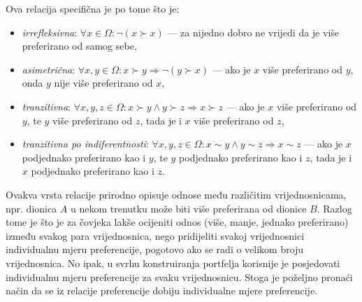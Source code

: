 \documentclass[lmodern, utf8, diplomski, numeric]{fer}
\begin{document}
  Ova relacija specifična je po tome što je:
  \begin{itemize}
    \item \textit{irrefleksivna}: $\forall x \in \Omega\colon \neg \left( x \succ x \right)$ --- za nijedno dobro ne vrijedi da je više preferirano od samog sebe,
    \item \textit{asimetrična}: $\forall x, y \in \Omega\colon x \succ y \Rightarrow \neg \left( y \succ x \right)$ --- ako je $x$ više preferirano od $y$, onda $y$ nije više preferirano od $x$,
    \item \textit{tranzitivna}: $\forall x, y, z \in \Omega\colon x \succ y \wedge y \succ z \Rightarrow x \succ z$ --- ako je $x$ više preferirano od $y$, te $y$ više preferirano od $z$, tada je i $x$ više preferirano od $z$,
    \item \textit{tranzitivna po indiferentnosti}: $\forall x, y, z \in \Omega\colon x \sim y \wedge y \sim z \Rightarrow x \sim z$ --- ako je $x$ podjednako preferirano kao i $y$, te $y$ podjednako preferirano kao i $z$, tada je i $x$ podjednako preferirano kao i $z$.
  \end{itemize}
  
  Ovakva vrsta relacije prirodno opisuje odnose među različitim vrijednosnicama, npr. dionica $A$ u nekom trenutku može biti više preferirana od dionice $B$.
  Razlog tome je što je za čovjeka lakše ocijeniti odnos (više, manje, jednako preferirano) između svakog para vrijednosnica, nego pridijeliti svakoj vrijednosnici individualnu mjeru preferencije, pogotovo ako se radi o velikom broju vrijednosnica.
  No ipak, u svrhu konstruiranja portfelja korisnije je posjedovati individualnu mjeru preferencije za svaku vrijednosnicu.
  Stoga je poželjno pronaći način da se iz relacije preferencije dobiju individualne mjere preferencije.
  
\end{document}
